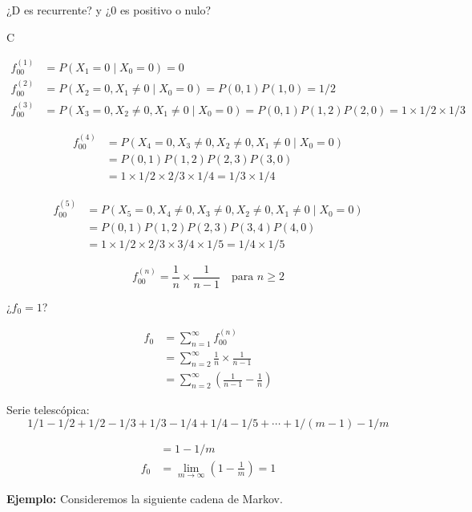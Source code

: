 \documentclass[12pt,a4paper]{article}
\begin{document}
¿D es recurrente? y ¿0 es positivo o nulo?

C

\begin{align*}
f_{00}^{(1)} &= P(X_1=0 \mid X_0=0) = 0 \\
f_{00}^{(2)} &= P(X_2=0, X_1 \neq 0 \mid X_0=0) = P(0,1) P(1,0) = 1/2 \\
f_{00}^{(3)} &= P(X_3=0, X_2 \neq 0, X_1 \neq 0 \mid X_0=0) = P(0,1) P(1,2) P(2,0) = 1 \times 1/2 \times 1/3
\end{align*}

\begin{align*}
f_{00}^{(4)} &= P(X_4=0, X_3 \neq 0, X_2 \neq 0, X_1 \neq 0 \mid X_0=0) \\
&= P(0,1) P(1,2) P(2,3) P(3,0) \\
&= 1 \times 1/2 \times 2/3 \times 1/4 = 1/3 \times 1/4
\end{align*}

\begin{align*}
f_{00}^{(5)} &= P(X_5=0, X_4 \neq 0, X_3 \neq 0, X_2 \neq 0, X_1 \neq 0 \mid X_0=0) \\
&= P(0,1) P(1,2) P(2,3) P(3,4) P(4,0) \\
&= 1 \times 1/2 \times 2/3 \times 3/4 \times 1/5 = 1/4 \times 1/5
\end{align*}


\begin{equation}
f_{00}^{(n)} = \frac{1}{n} \times \frac{1}{n-1} \quad \text{para } n \geq 2
\end{equation}

¿$f_0 = 1$?

\begin{align*}
f_0 &= \sum_{n=1}^{\infty} f_{00}^{(n)} \\
&= \sum_{n=2}^{\infty} \frac{1}{n} \times \frac{1}{n-1} \\
&= \sum_{n=2}^{\infty} \left(\frac{1}{n-1} - \frac{1}{n}\right)
\end{align*}

Serie telescópica:
\begin{equation}
1/1 - 1/2 + 1/2 - 1/3 + 1/3 - 1/4 + 1/4 - 1/5 + \cdots + 1/(m-1) - 1/m
\end{equation}

\begin{align*}
&= 1 - 1/m \\
f_0 &= \lim_{m \to \infty} \left(1 - \frac{1}{m}\right) = 1
\end{align*}

\textbf{Ejemplo:} Consideremos la siguiente cadena de Markov.
\end{document}
